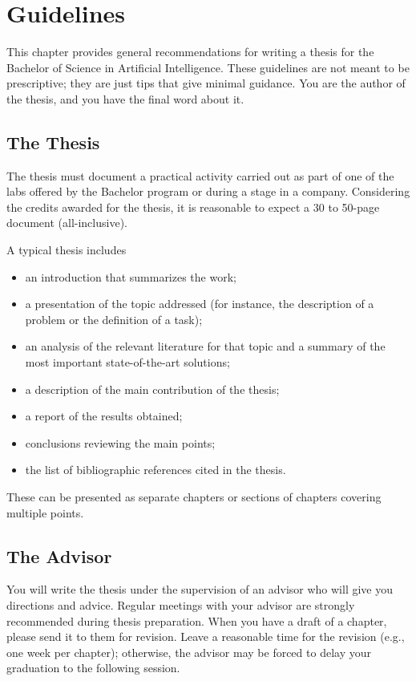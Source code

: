 \chapter{Guidelines}
\label{ch:guidelines}

This chapter provides general recommendations for writing a thesis for the Bachelor of Science in Artificial Intelligence. These guidelines are not meant to be prescriptive; they are just tips that give minimal guidance. You are the author of the thesis, and you have the final word about it.

\section{The Thesis}

The thesis must document a practical activity carried out as part of one of the labs offered by the Bachelor program or during a stage in a company. Considering the credits awarded for the thesis, it is reasonable to expect a 30 to 50-page document (all-inclusive).

A typical thesis includes
\begin{itemize}
    \item an introduction that summarizes the work;
    \item a presentation of the topic addressed (for instance, the description of a problem or the definition of a task);
    \item an analysis of the relevant literature for that topic and a summary of the most important state-of-the-art solutions;
    \item a description of the main contribution of the thesis;
    \item a report of the results obtained;
    \item conclusions reviewing the main points;
    \item the list of bibliographic references cited in the thesis.
\end{itemize}
%
These can be presented as separate chapters or sections of chapters covering multiple points. 

\section{The Advisor}

You will write the thesis under the supervision of an advisor who will give you directions and advice. Regular meetings with your advisor are strongly recommended during thesis preparation. When you have a draft of a chapter, please send it to them for revision. Leave a reasonable time for the revision (e.g., one week per chapter); otherwise, the advisor may be forced to delay your graduation to the following session. 

